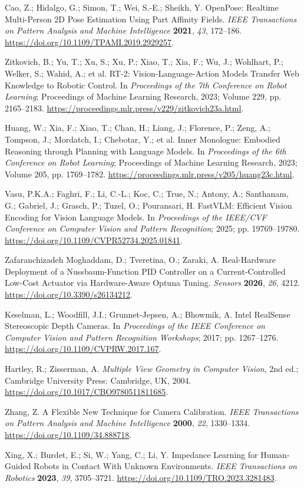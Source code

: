  Cao, Z.; Hidalgo, G.; Simon, T.; Wei, S.-E.; Sheikh, Y. OpenPose: Realtime Multi-Person 2D Pose Estimation Using Part Affinity Fields. \emph{IEEE Transactions on Pattern Analysis and Machine Intelligence} \textbf{2021}, \emph{43}, 172--186. \url{https://doi.org/10.1109/TPAMI.2019.2929257}.

 Zitkovich, B.; Yu, T.; Xu, S.; Xu, P.; Xiao, T.; Xia, F.; Wu, J.; Wohlhart, P.; Welker, S.; Wahid, A.; et al. RT-2: Vision-Language-Action Models Transfer Web Knowledge to Robotic Control. In \emph{Proceedings of the 7th Conference on Robot Learning}; Proceedings of Machine Learning Research, 2023; Volume 229, pp. 2165--2183. \url{https://proceedings.mlr.press/v229/zitkovich23a.html}.

 Huang, W.; Xia, F.; Xiao, T.; Chan, H.; Liang, J.; Florence, P.; Zeng, A.; Tompson, J.; Mordatch, I.; Chebotar, Y.; et al. Inner Monologue: Embodied Reasoning through Planning with Language Models. In \emph{Proceedings of the 6th Conference on Robot Learning}; Proceedings of Machine Learning Research, 2023; Volume 205, pp. 1769--1782. \url{https://proceedings.mlr.press/v205/huang23c.html}.

 Vasu, P.K.A.; Faghri, F.; Li, C.-L.; Koc, C.; True, N.; Antony, A.; Santhanam, G.; Gabriel, J.; Grasch, P.; Tuzel, O.; Pouransari, H. FastVLM: Efficient Vision Encoding for Vision Language Models. In \emph{Proceedings of the IEEE/CVF Conference on Computer Vision and Pattern Recognition}; 2025; pp. 19769--19780. \url{https://doi.org/10.1109/CVPR52734.2025.01841}.

 Zafaranchizadeh Moghaddam, D.; Tveretina, O.; Zaraki, A. Real-Hardware Deployment of a Nussbaum-Function PID Controller on a Current-Controlled Low-Cost Actuator via Hardware-Aware Optuna Tuning. \emph{Sensors} \textbf{2026}, \emph{26}, 4212. \url{https://doi.org/10.3390/s26134212}.

 Keselman, L.; Woodfill, J.I.; Grunnet-Jepsen, A.; Bhowmik, A. Intel RealSense Stereoscopic Depth Cameras. In \emph{Proceedings of the IEEE Conference on Computer Vision and Pattern Recognition Workshops}; 2017; pp. 1267--1276. \url{https://doi.org/10.1109/CVPRW.2017.167}.

 Hartley, R.; Zisserman, A. \emph{Multiple View Geometry in Computer Vision}, 2nd ed.; Cambridge University Press: Cambridge, UK, 2004. \url{https://doi.org/10.1017/CBO9780511811685}.

 Zhang, Z. A Flexible New Technique for Camera Calibration. \emph{IEEE Transactions on Pattern Analysis and Machine Intelligence} \textbf{2000}, \emph{22}, 1330--1334. \url{https://doi.org/10.1109/34.888718}.

 Xing, X.; Burdet, E.; Si, W.; Yang, C.; Li, Y. Impedance Learning for Human-Guided Robots in Contact With Unknown Environments. \emph{IEEE Transactions on Robotics} \textbf{2023}, \emph{39}, 3705--3721. \url{https://doi.org/10.1109/TRO.2023.3281483}.
